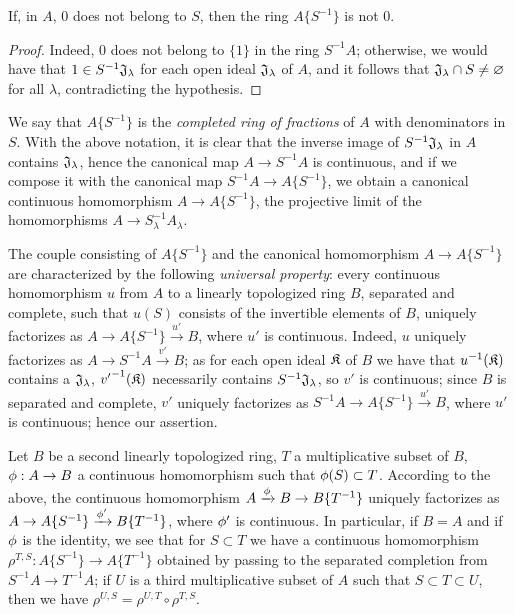 \begin{cor}[7.6.4]
\label{0.7.6.4}
If, in $A$, $0$ does not belong to $S$, then the ring $A\{S^{-1}\}$ is not $0$.
\end{cor}

\begin{proof}
\label{proof-0.7.6.4}
Indeed, $0$ does not belong to $\{1\}$ in the ring $S^{-1}A$; otherwise, we would have that
$1\in S^{-1}\mathfrak{J}_\lambda$ for each open ideal $\mathfrak{J}_\lambda$ of $A$, and it
follows that $\mathfrak{J}_\lambda\cap S\neq\varnothing$ for all $\lambda$, contradicting the
hypothesis.
\end{proof}

\begin{env}[7.6.5]
\label{0.7.6.5}
We say that $A\{S^{-1}\}$ is the {\em completed ring of fractions} of $A$ with denominators
in $S$. With the above notation, it is clear that the inverse image of $S^{-1}\mathfrak{J}_\lambda$
in $A$ contains $\mathfrak{J}_\lambda$, hence the canonical map $A\to S^{-1}A$ is continuous, and if
we compose it with the canonical map $S^{-1}A\to A\{S^{-1}\}$, we obtain a canonical continuous
homomorphism $A\to A\{S^{-1}\}$, the projective limit of the homomorphisms
$A\to S_\lambda^{-1}A_\lambda$.
\end{env}

\begin{env}[7.6.6]
\label{0.7.6.6}
The couple consisting of $A\{S^{-1}\}$ and the canonical homomorphism $A\to A\{S^{-1}\}$ are
characterized by the following {\em universal property}: every continuous homomorphism $u$ from
$A$ to a linearly topologized ring $B$, separated and complete, such that $u(S)$ consists of
the invertible elements of $B$, uniquely factorizes as $A\to A\{S^{-1}\}\xrightarrow{u'}B$, where
$u'$ is continuous. Indeed, $u$ uniquely factorizes as $A\to S^{-1}A\xrightarrow{v'}B$; as for
each open ideal $\mathfrak{K}$ of $B$ we have that $u^{-1}(\mathfrak{K})$ contains a
$\mathfrak{J}_\lambda$, ${v'}^{-1}(\mathfrak{K})$ necessarily contains $S^{-1}\mathfrak{J}_\lambda$,
so $v'$ is continuous; since $B$ is separated and complete, $v'$ uniquely factorizes as
$S^{-1}A\to A\{S^{-1}\}\xrightarrow{u'}B$, where $u'$ is continuous; hence our assertion.
\end{env}

\begin{env}[7.6.7]
\label{0.7.6.7}
Let $B$ be a second linearly topologized ring, $T$ a multiplicative subset of $B$,
$\phi:A\to B$ a continuous homomorphism such that $\phi(S)\subset T$. According to the above,
the continuous homomorphism $A\xrightarrow{\phi}B\to B\{T^{-1}\}$ uniquely factorizes as
$A\to A\{S^{-1}\}\xrightarrow{\phi'}B\{T^{-1}\}$, where $\phi'$ is continuous. In particular,
if $B=A$ and if $\phi$ is the identity, we see that for $S\subset T$ we have a continuous
homomorphism $\rho^{T,S}:A\{S^{-1}\}\to A\{T^{-1}\}$ obtained by passing to the separated completion
from $S^{-1}A\to T^{-1}A$; if $U$ is a third multiplicative subset of $A$ such that
$S\subset T\subset U$, then we have $\rho^{U,S}=\rho^{U,T}\circ\rho^{T,S}$.
\end{env}

